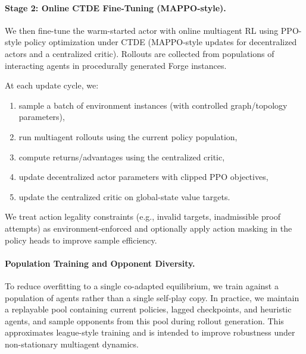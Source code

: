 \documentclass[letterpaper]{article} %
\begin{document}
\paragraph{Stage 2: Online CTDE Fine-Tuning (MAPPO-style).}
We then fine-tune the warm-started actor with online multiagent RL using PPO-style policy optimization under CTDE (MAPPO-style updates for decentralized actors and a centralized critic). Rollouts are collected from populations of interacting agents in procedurally generated Forge instances.

At each update cycle, we:
\begin{enumerate}
    \item sample a batch of environment instances (with controlled graph/topology parameters),
    \item run multiagent rollouts using the current policy population,
    \item compute returns/advantages using the centralized critic,
    \item update decentralized actor parameters with clipped PPO objectives,
    \item update the centralized critic on global-state value targets.
\end{enumerate}
We treat action legality constraints (e.g., invalid targets, inadmissible proof attempts) as environment-enforced and optionally apply action masking in the policy heads to improve sample efficiency.

\paragraph{Population Training and Opponent Diversity.}
To reduce overfitting to a single co-adapted equilibrium, we train against a population of agents rather than a single self-play copy. In practice, we maintain a replayable pool containing current policies, lagged checkpoints, and heuristic agents, and sample opponents from this pool during rollout generation. This approximates league-style training and is intended to improve robustness under non-stationary multiagent dynamics.
\end{document}
